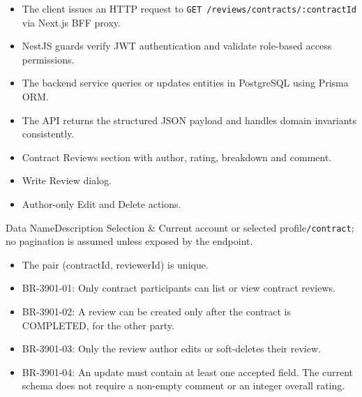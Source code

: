 \begin{itemize}[leftmargin=1.6em,topsep=3pt,itemsep=2pt,parsep=0pt,label=$\bullet$]
    \item The client issues an HTTP request to \texttt{GET /\allowbreak{}reviews/\allowbreak{}contracts/\allowbreak{}:\allowbreak{}contractId} via Next.js BFF proxy.
    \item NestJS guards verify JWT authentication and validate role-based access permissions.
    \item The backend service queries or updates entities in PostgreSQL using Prisma ORM.
    \item The API returns the structured JSON payload and handles domain invariants consistently.
\end{itemize}

\begin{itemize}[leftmargin=1.6em,topsep=3pt,itemsep=2pt,parsep=0pt,label=$\bullet$]
    \item Contract Reviews section with author, rating, breakdown and comment.
    \item Write Review dialog.
    \item Author-only Edit and Delete actions.
\end{itemize}


\begin{specdatatable}{Data Name}{Description}
Selection & Current account or selected profile\texttt{/\allowbreak{}contract}; no pagination is assumed unless exposed by the endpoint.\\ \hline
\end{specdatatable}

\begin{itemize}[leftmargin=1.6em,topsep=3pt,itemsep=2pt,parsep=0pt,label=$\bullet$]
    \item The pair (contractId, reviewerId) is unique.
\end{itemize}

\begin{itemize}[leftmargin=1.6em,topsep=3pt,itemsep=2pt,parsep=0pt,label=$\bullet$]\brrulelist
    \item BR-3901-01: Only contract participants can list or view contract reviews.
    \item BR-3901-02: A review can be created only after the contract is COMPLETED, for the other party.
    \item BR-3901-03: Only the review author edits or soft-deletes their review.
    \item BR-3901-04: An update must contain at least one accepted field. The current schema does not require a non-empty comment or an integer overall rating.
\end{itemize}

